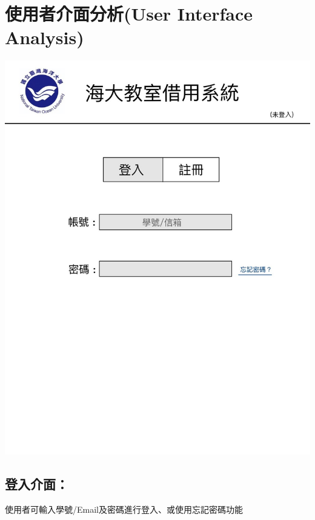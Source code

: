 \documentclass{article}
\begin{document}
\section[使用者介面分析(USER INTERFACE ANALYSIS)]{使用者介面分析(User Interface Analysis)}

\begin{minipage}{0.6\linewidth}
	\includegraphics[height=0.4\textheight]{Log_In_GUI.jpg}
\end{minipage}
\begin{minipage}{0.4\linewidth}
	\subsection*{登入介面：}使用者可輸入學號/Email及密碼進行登入、或使用忘記密碼功能
\end{minipage}
\end{document}
